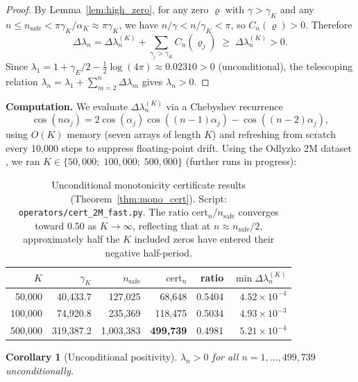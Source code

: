 \documentclass[11pt]{article}
\newtheorem{corollary}[theorem]{Corollary}
\begin{document}
\begin{proof}
By Lemma~\ref{lem:high_zero}, for any zero $\varrho$ with $\gamma > \gamma_K$ and any
$n \le n_{\mathrm{safe}} < \pi\gamma_K/\alpha_K \approx \pi\gamma_K$, we have $n/\gamma < n/\gamma_K < \pi$,
so $C_n(\varrho) > 0$.  Therefore
\[
  \Delta\lambda_n = \Delta\lambda_n^{(K)} + \sum_{\gamma_j > \gamma_K} C_n(\varrho_j) \;\ge\; \Delta\lambda_n^{(K)} > 0.
\]
Since $\lambda_1 = 1 + \gamma_E/2 - \tfrac{1}{2}\log(4\pi) \approx 0.02310 > 0$ (unconditional),
the telescoping relation $\lambda_n = \lambda_1 + \sum_{m=2}^n \Delta\lambda_m$ gives $\lambda_n > 0$.
\end{proof}

\noindent\textbf{Computation.}
We evaluate $\Delta\lambda_n^{(K)}$ via a Chebyshev recurrence
\[
  \cos(n\alpha_j) = 2\cos(\alpha_j)\cos((n{-}1)\alpha_j) - \cos((n{-}2)\alpha_j),
\]
using $O(K)$ memory (seven arrays of length $K$) and refreshing from scratch every 10{,}000 steps
to suppress floating-point drift.  Using the Odlyzko 2M dataset \cite{odlyzko1987}, we ran $K \in
\{50{,}000;\;100{,}000;\;500{,}000\}$ (further runs in progress):

\begin{table}[H]
\centering
\begin{tabular}{rrrrrr}
\toprule
$K$ & $\gamma_K$ & $n_{\mathrm{safe}}$ & $\mathrm{cert}_n$ & ratio & $\min\Delta\lambda_n^{(K)}$ \\
\midrule
50{,}000  & 40{,}433.7 & 127{,}025  & 68{,}648  & 0.5404 & $4.52\times10^{-4}$ \\
100{,}000 & 74{,}920.8 & 235{,}369  & 118{,}475 & 0.5034 & $4.93\times10^{-3}$ \\
500{,}000 & 319{,}387.2 & 1{,}003{,}383 & \textbf{499{,}739} & 0.4981 & $5.21\times10^{-4}$ \\
\bottomrule
\end{tabular}
\caption{Unconditional monotonicity certificate results (Theorem~\ref{thm:mono_cert}).
Script: \texttt{operators/cert\_2M\_fast.py}.
The ratio $\mathrm{cert}_n/n_{\mathrm{safe}}$ converges toward $0.50$ as $K\to\infty$,
reflecting that at $n\approx n_{\mathrm{safe}}/2$, approximately half the $K$ included zeros
have entered their negative half-period.}
\end{table}

\begin{corollary}[Unconditional positivity]
$\lambda_n > 0$ for all $n = 1,\ldots,499{,}739$ unconditionally.
\end{corollary}
\end{document}
